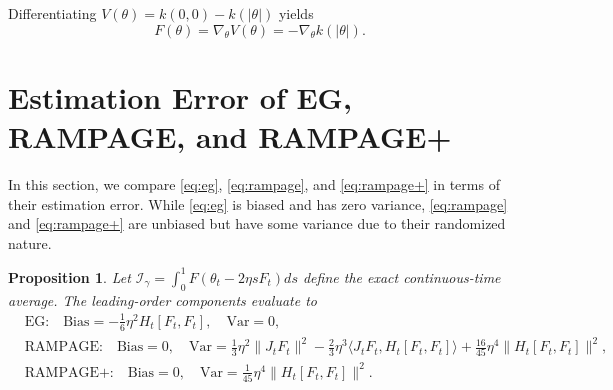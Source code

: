 \documentclass[letter,11pt]{article}
\newtheorem{proposition}{Proposition}[]
\begin{document}
Differentiating $V(\theta) = k(0,0) - k(|\theta|)$ yields
\begin{equation}
F(\theta) = \nabla_\theta V(\theta) = -\nabla_\theta k(|\theta|).
\end{equation}
\section{Estimation Error of EG, RAMPAGE, and RAMPAGE+}\label{app:variance}
In this section, we compare \eqref{eq:eg}, \eqref{eq:rampage}, and \eqref{eq:rampage+} in terms of their estimation error. While \eqref{eq:eg} is biased and has zero variance, \eqref{eq:rampage} and \eqref{eq:rampage+} are unbiased but have some variance due to their randomized nature.

\begin{proposition} \label{prop:estimation_error}
Let $\mathcal{I}_{\gamma} = \int_0^1 F(\theta_t - 2\eta s F_t) ds$ define the exact continuous-time average. The leading-order components evaluate to
\begin{equation} \label{eq:error_comparison}
\begin{aligned}
&\text{EG:} \quad \text{Bias} = -\frac{1}{6}\eta^2 H_t[F_t, F_t], \quad \text{Var} = 0, \\
&\text{RAMPAGE:} \quad \text{Bias} = 0, \quad \text{Var} = \frac{1}{3}\eta^2 \|J_t F_t\|^2 - \frac{2}{3}\eta^3 \langle J_t F_t, H_t[F_t, F_t] \rangle + \frac{16}{45}\eta^4 \|H_t[F_t, F_t]\|^2,\\
&\text{RAMPAGE+:} \quad\text{Bias} = 0, \quad \text{Var} = \frac{1}{45}\eta^4 \|H_t[F_t, F_t]\|^2.
\end{aligned}
\end{equation}
\end{proposition}
\end{document}
